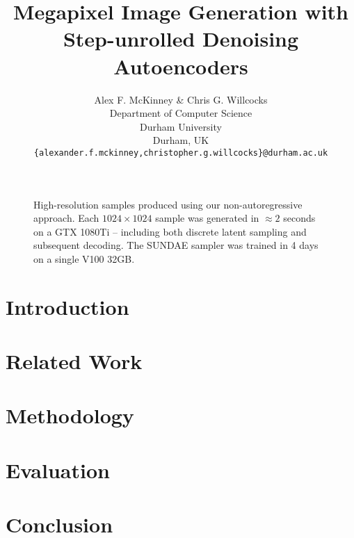 \documentclass{article} %
\title{Megapixel Image Generation with Step-unrolled Denoising Autoencoders}
\author{Alex F. McKinney \& Chris G. Willcocks \\
Department of Computer Science\\
Durham University\\
Durham, UK \\
\texttt{\{alexander.f.mckinney,christopher.g.willcocks\}@durham.ac.uk} \\
}
\begin{document}
\maketitle

\begin{abstract}
    
\end{abstract}

\begin{figure}[ht]
    \centering
    \caption{
        High-resolution samples produced using our non-autoregressive approach.
        Each $1024 \times 1024$ sample was generated in $\approx 2$ seconds on a
        GTX 1080Ti -- including both discrete latent sampling and subsequent
        decoding. The SUNDAE sampler was trained in 4 days on a single V100
        32GB.
    }
\end{figure}

\section{Introduction}\label{sec:intro}


\section{Related Work}\label{sec:related}


\section{Methodology}\label{sec:method}


\section{Evaluation}\label{sec:evaluation}


\section{Conclusion}\label{sec:conclusion}



{\small }
\end{document}
